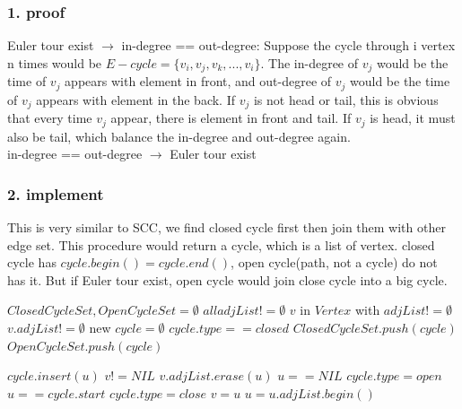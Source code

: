 \documentclass[]{article}
\begin{document}
\subsubsection{1. proof}

Euler tour exist $\rightarrow$ in-degree == out-degree: Suppose the cycle through i vertex n times would be $E-cycle = \{ v_{i}, v_{j}, v_{k}, ... , v_{i} \}$. The in-degree of $v_{j}$ would be the time of  $v_{j}$ appears with element in front, and out-degree of $v_{j}$ would be the time of $v_{j}$ appears with element in the back. If $v_{j}$ is not head or tail, this is obvious that every time $v_{j}$ appear, there is element in front and tail. If $v_{j}$ is head, it must also be tail, which balance the in-degree and out-degree again.\\

in-degree == out-degree $\rightarrow$ Euler tour exist

\subsubsection{2. implement}

This is very similar to SCC, we find closed cycle first then join them with other edge set. This procedure would return a cycle, which is a list of vertex. closed cycle has $cycle.begin() = cycle.end()$, open cycle(path, not a cycle) do not has it. But if Euler tour exist, open cycle would join close cycle into a big cycle.

\begin{codebox}
	
	\li $ClosedCycleSet, OpenCycleSet = \emptyset$
	\li \While $all adjList != \emptyset$ \Do
	\li \For $v$ in $Vertex$ with $adjList != \emptyset$\Do
	\li \If $v.adjList != \emptyset$ \Then
	\li new $cycle = \emptyset$
	\li {}
	\li \If $cycle.type == closed$
	\li \Then $ClosedCycleSet.push(cycle)$
	\li \Else $OpenCycleSet.push(cycle)$
	
\end{codebox}

\begin{codebox}
	
	\li $cycle.insert(u)$
	\li \If $v != NIL$ 
	\li \Then $v.adjList.erase(u)$ \End
	\li \If $u == NIL$ 
	\li \Then $cycle.type = open$
	\li \Return  
	\li \ElseIf $u == cycle.start$ 
	\li \Then $cycle.type = close$
	\li \Return 
	\li \Else $v = u$
	\li $u = u.adjList.begin()$
	\li {}
	\End
	\End
	
\end{codebox}
\end{document}
